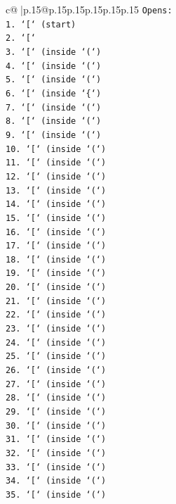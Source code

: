 \documentclass{article}
\begin{document}
{\begin{supertabular}{c@{$\;$}|p{.15\linewidth}@{}p{.15\linewidth}p{.15\linewidth}p{.15\linewidth}p{.15\linewidth}p{.15\linewidth}}
{{{\texttt{Opens:} \\
\texttt{1. `{[}` (start)} \\
\texttt{2. `{[}`} \\
\texttt{3. `{[}` (inside `(`)} \\
\texttt{4. `{[}` (inside `(`)} \\
\texttt{5. `{[}` (inside `(`)} \\
\texttt{6. `{[}` (inside `\{`)} \\
\texttt{7. `{[}` (inside `(`)} \\
\texttt{8. `{[}` (inside `(`)} \\
\texttt{9. `{[}` (inside `(`)} \\
\texttt{10. `{[}` (inside `(`)} \\
\texttt{11. `{[}` (inside `(`)} \\
\texttt{12. `{[}` (inside `(`)} \\
\texttt{13. `{[}` (inside `(`)} \\
\texttt{14. `{[}` (inside `(`)} \\
\texttt{15. `{[}` (inside `(`)} \\
\texttt{16. `{[}` (inside `(`)} \\
\texttt{17. `{[}` (inside `(`)} \\
\texttt{18. `{[}` (inside `(`)} \\
\texttt{19. `{[}` (inside `(`)} \\
\texttt{20. `{[}` (inside `(`)} \\
\texttt{21. `{[}` (inside `(`)} \\
\texttt{22. `{[}` (inside `(`)} \\
\texttt{23. `{[}` (inside `(`)} \\
\texttt{24. `{[}` (inside `(`)} \\
\texttt{25. `{[}` (inside `(`)} \\
\texttt{26. `{[}` (inside `(`)} \\
\texttt{27. `{[}` (inside `(`)} \\
\texttt{28. `{[}` (inside `(`)} \\
\texttt{29. `{[}` (inside `(`)} \\
\texttt{30. `{[}` (inside `(`)} \\
\texttt{31. `{[}` (inside `(`)} \\
\texttt{32. `{[}` (inside `(`)} \\
\texttt{33. `{[}` (inside `(`)} \\
\texttt{34. `{[}` (inside `(`)} \\
\texttt{35. `{[}` (inside `(`)} \\
}}}
\end{supertabular}}
\end{document}
